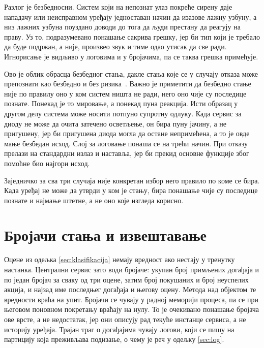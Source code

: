 \documentclass[12pt,oneside]{memoir}
\begin{document}
Разлог је безбедносни. Систем који на непознат улаз покреће сирену даје напад\-ачу или
неисправном уређају једноставан начин да изазове лажну узбуну, а низ лажних узбуна поуздано
доводи до тога да људи престану да реагују на праву. Уз то, подразумевано понашање сакрива
грешку, јер би тип који је требало да буде подржан, а није, произвео звук и тиме одао утисак
да све ради. Игнорисање је видљиво у логовима и у бројачима, па се таква грешка примећује.

Ово је облик обрасца безбедног стања, дакле стања које се у случају отказа може препознати
као безбедно и без ризика~\cite{Armoush2010}. Важно је приметити да безбедно стање није по 
правилу оно у ком систем ништа не ради, него оно чије су последице познате. 
Понекад је то мировање, а понекад пуна реакција. Исти образац у другом делу система
може носити потпуно супротну одлуку. Када сервис за диоду не може да очита затечено осветљење, он бира пуну јачину, 
а не пригушену, јер би пригушена диода могла да остане непримећена, а то је овде мање безбедан исход. 
Слој за логовање понаша се на трећи начин. При отказу прелази на
стандардни излаз и наставља, јер би прекид основне функције због помоћне био најгори исход.

Заједничко за сва три случаја није конкретан избор него правило по коме се бира. Када уређај
не може да утврди у ком је стању, бира понашање чије су последице познате и најмање штетне,
а не оно које изгледа корисно.

\section{Бројачи стања и извештавање}
\label{sec:brojaci}

Оцене из одељка \ref{sec:klasifikacija} немају вредност ако нестају у тренутку настанка.
Централни сервис зато води бројаче: укупан број примљених догађаја и по један бројач за
сваку од три оцене, затим број покушаних и број неуспелих акција, и најзад име последњег
догађаја и његову оцену. Метода  над објектом  те
вредности враћа на упит. Бројачи се чувају у радној меморији процеса, па се при његовом поновном
покретању враћају на нулу. То је очекивано понашање бројача ове врсте, а не недостатак, јер
они описују рад текуће инстанце сервиса, а не историју уређаја. Трајан траг о догађајима
чувају логови, који се пишу на партицију која преживљава подизање, о чему је реч у
одељку \ref{sec:log}.
\end{document}
